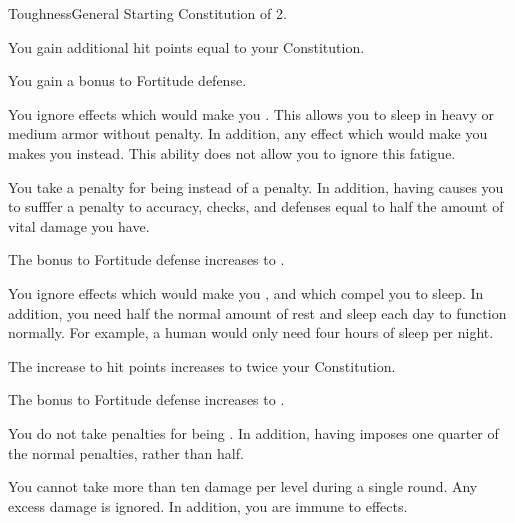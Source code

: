     \begin{feat}{Toughness}{General}
        \featpre Starting Constitution of 2.
        \featben

         You gain additional hit points equal to your Constitution.

         You gain a  bonus to Fortitude defense.

         You ignore effects which would make you \fatigued.
        This allows you to sleep in heavy or medium armor without penalty.
        In addition, any effect which would make you \exhausted makes you \fatigued instead.
        This ability does not allow you to ignore this fatigue.

         You take a  penalty for being  instead of a  penalty.
        In addition, having  causes you to sufffer a penalty to accuracy, checks, and defenses equal to half the amount of vital damage you have.

         The bonus to Fortitude defense increases to .

         You ignore effects which would make you \exhausted, and which compel you to sleep.
        In addition, you need half the normal amount of rest and sleep each day to function normally.
        For example, a human would only need four hours of sleep per night.

         The increase to hit points increases to twice your Constitution.

         The bonus to Fortitude defense increases to .

         You do not take penalties for being .
        In addition, having  imposes one quarter of the normal penalties, rather than half.

         You cannot take more than ten damage per level during a single round.
        Any excess damage is ignored.
        In addition, you are immune to  effects.
    \end{feat}


